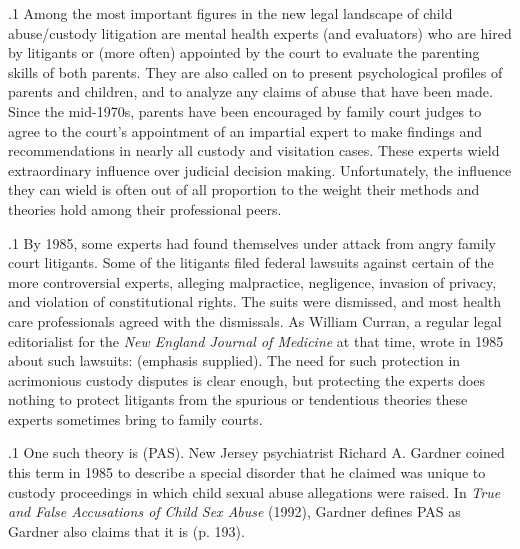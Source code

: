 \documentclass[11pt, twoside]{article}
\begin{document}
{\p.1{%
Among the most important figures in the new legal landscape of child
abuse/custody litigation are mental health experts (and evaluators) who
are hired by litigants or (more often) appointed by the court to evaluate
the parenting skills of both parents. They are also called on to present
psychological profiles of parents and children, and to analyze any claims
of abuse that have been made. Since the mid-1970s, parents have been
encouraged by family court judges to agree to the court’s appointment
of an impartial expert to make findings and recommendations in nearly
all custody and visitation cases. These experts wield extraordinary influence over judicial decision making. Unfortunately, the influence they
can wield is often out of all proportion to the weight their methods and
theories hold among their professional peers.
}%

\p.1{%
By 1985, some experts had found themselves under attack from angry
family court litigants. Some of the litigants filed federal lawsuits against
certain of the more controversial experts, alleging malpractice, negligence, invasion of privacy, and violation of constitutional rights. The
suits were dismissed, and most health care professionals agreed with
the dismissals. As William Curran, a regular legal editorialist for the
\textit{New England Journal of Medicine} at that time, wrote in 1985 about such
lawsuits:  (emphasis supplied).
The need for such protection in acrimonious custody disputes is clear
enough, but protecting the experts does nothing to protect litigants from
the spurious or tendentious theories these experts sometimes bring to
family courts.
}%

\p.1{%
One such theory is  (PAS). New Jersey
psychiatrist Richard A. Gardner coined this term in 1985 to describe
a special disorder that he claimed was unique to custody proceedings
in which child sexual abuse allegations were raised. In \textit{True and False
Accusations of Child Sex Abuse} (1992), Gardner defines PAS as 
Gardner also claims that it is  (p. 193).
}%

}
\end{document}
